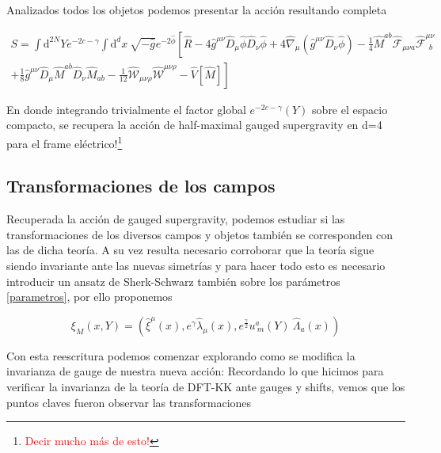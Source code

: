 \documentclass{article}
\numberwithin{equation}{section}
\begin{document}
Analizados todos los objetos podemos presentar la acción resultando completa\\


\begin{boxquation}
	\begin{equation}\label{Sgsugra}
	\begin{aligned}
	S = \int \mathrm{d}^{2N} Y e^{-2c - \gamma} \int \mathrm{d}^d x \  \sqrt{-\hat{g}}e^{-2 \hat{\phi}} \left[ \hat{R} -4\hat{g}^{\mu \nu} \hat{D}_{\mu} \hat{\phi} \hat{D}_{\nu} \hat{\phi} + 4 \hat{\nabla}_{\mu} \left(\hat{g}^{\mu \nu} \hat{D}_{\nu} \hat{\phi}\right) - \frac{1}{4} \hat{M}^{a b} \hat{\mathcal{F}}_{\mu \nu a} \hat{\mathcal{F}}^{\mu \nu}_{\ \ b} \right.\\
	\left. + \frac{1}{8} \hat{g}^{\mu \nu} \hat{D}_{\mu} \hat{M}^{a b} \hat{D}_{\nu} \hat{M}_{a b}  - \frac{1}{12}\hat{\mathcal{W}}_{\mu \nu \rho}\hat{\mathcal{W}}^{\mu \nu \rho} - \hat{V}[\hat{M}] \right]
	\end{aligned}
	\end{equation}
\end{boxquation}

\vspace{.5cm}

En donde integrando trivialmente el factor global $ e^{-2c - \gamma} (Y) $ sobre el espacio compacto, se recupera la acción de half-maximal gauged supergravity en d=4 para el frame eléctrico!\footnote{\textcolor{red}{Decir mucho más de esto!}}

\subsection{\textcolor{white!60!teal}{Transformaciones de los campos}}

Recuperada la acción de gauged supergravity, podemos estudiar si las transformaciones de los diversos campos y objetos también se corresponden con las de dicha teoría. A su vez resulta necesario corroborar que la teoría sigue siendo invariante ante las nuevas simetrías y para hacer todo esto es necesario introducir un ansatz de Sherk-Schwarz también sobre los parámetros \ref{parametros}, por ello proponemos

\begin{equation}
\xi_M(x,Y)=(\hat{\xi}^{\mu}(x), e^{\gamma} \hat{\lambda}_{\mu}(x), e^{\frac{\gamma}{2}} u^{a}_{\ m}(Y)\ \hat{\Lambda}_a(x))
\end{equation}

Con esta reescritura podemos comenzar explorando como se modifica la invarianza de gauge de nuestra nueva acción: Recordando lo que hicimos para verificar la invarianza de la teoría de DFT-KK ante gauges y shifts, vemos que los puntos claves fueron observar las transformaciones
\end{document}
